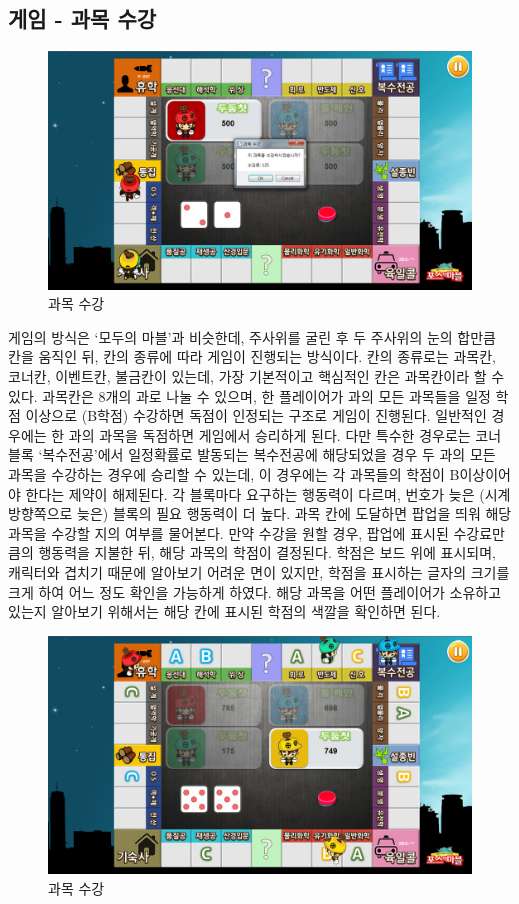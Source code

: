 \documentclass[10pt,oneside,a4paper,titlepage]{article}
\begin{document}
\subsection{게임 - 과목 수강}
\begin{figure}[H]
\centering
\centerline{\includegraphics[scale=0.65]{images/4buySubject}}
\caption{과목 수강}
\end{figure}

 게임의 방식은 ‘모두의 마블’과 비슷한데, 주사위를 굴린 후 두 주사위의 눈의 합만큼 칸을 움직인 뒤, 칸의 종류에 따라 게임이 진행되는 방식이다. 칸의 종류로는 과목칸, 코너칸, 이벤트칸, 불금칸이 있는데, 가장 기본적이고 핵심적인 칸은 과목칸이라 할 수 있다. 과목칸은 8개의 과로 나눌 수 있으며, 한 플레이어가 과의 모든 과목들을 일정 학점 이상으로 (B학점) 수강하면 독점이 인정되는 구조로 게임이 진행된다. 일반적인 경우에는 한 과의 과목을 독점하면 게임에서 승리하게 된다. 다만 특수한 경우로는 코너 블록 ‘복수전공’에서 일정확률로 발동되는 복수전공에 해당되었을 경우 두 과의 모든 과목을 수강하는 경우에 승리할 수 있는데, 이 경우에는 각 과목들의 학점이 B이상이어야 한다는 제약이 해제된다. 각 블록마다 요구하는 행동력이 다르며, 번호가 늦은 (시계방향쪽으로 늦은) 블록의 필요 행동력이 더 높다. 과목 칸에 도달하면 팝업을 띄워 해당 과목을 수강할 지의 여부를 물어본다. 만약 수강을 원할 경우, 팝업에 표시된 수강료만큼의 행동력을 지불한 뒤, 해당 과목의 학점이 결정된다. 학점은 보드 위에 표시되며, 캐릭터와 겹치기 때문에 알아보기 어려운 면이 있지만, 학점을 표시하는 글자의 크기를 크게 하여 어느 정도 확인을 가능하게 하였다. 해당 과목을 어떤 플레이어가 소유하고 있는지 알아보기 위해서는 해당 칸에 표시된 학점의 색깔을 확인하면 된다.
 

\begin{figure}[H]
\centering
\centerline{\includegraphics[scale=0.65]{images/4buySubject2}}
\caption{과목 수강}
\end{figure}
 
\end{document}
